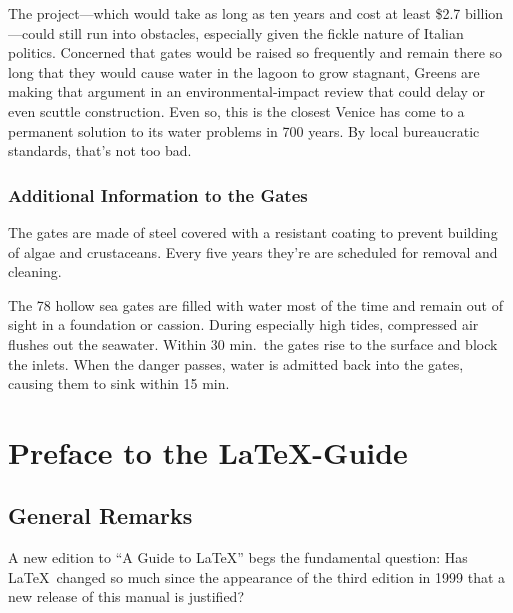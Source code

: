 \documentclass[twoside]{report}
\begin{document}
The project---which would take as long as ten years and cost at least
\$2.7 billion---could still run into obstacles, especially given the
fickle nature of Italian politics. Concerned that gates would be raised
so frequently and remain there so long that they would cause water in the
lagoon to grow stagnant, Greens are making that argument in an
environmental-impact review that could delay or even scuttle construction.
Even so, this is the closest Venice has come to a permanent solution to 
its water problems in 700 years. By local bureaucratic standards, that's
not too bad.


\subsection{Additional Information to the Gates}

The gates are made of steel covered with a resistant coating to prevent
building of algae and crustaceans. Every five years they're are scheduled 
for removal and cleaning.

The 78 hollow sea gates are filled with water most of the time and remain
out of sight in a foundation or cassion. During especially high tides,
compressed air flushes out the seawater. Within 30 min.\ the gates rise
to the surface and block the inlets. When the danger passes, water is
admitted back into the gates, causing them to sink within 15 min. 

\chapter[Preface]{Preface to the \LaTeX-Guide}
\section{General Remarks}

A new edition to ``A Guide to \LaTeX'' begs the fundamental question:
Has \LaTeX\ changed so much since the appearance of the third edition in 1999
that a new release of this manual is justified?
\end{document}

